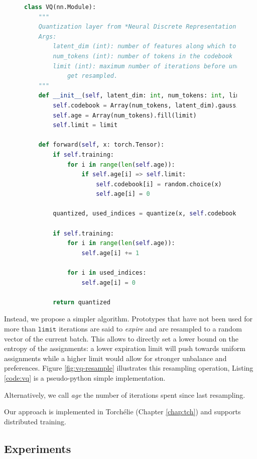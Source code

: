 \begin{figure}
\begin{lstlisting}[language=Python, caption=VQ with expiration (pseudo python),label={code:vq}]
class VQ(nn.Module):
    """
    Quantization layer from *Neural Discrete Representation Learning*
    Args:
        latent_dim (int): number of features along which to quantize
        num_tokens (int): number of tokens in the codebook
        limit (int): maximum number of iterations before unused codepoints
            get resampled.
    """
    def __init__(self, latent_dim: int, num_tokens: int, limit: int):
        self.codebook = Array(num_tokens, latent_dim).gaussian_init()
        self.age = Array(num_tokens).fill(limit)
        self.limit = limit

    def forward(self, x: torch.Tensor):
        if self.training:
            for i in range(len(self.age)):
                if self.age[i] => self.limit:
                    self.codebook[i] = random.choice(x)
                    self.age[i] = 0

        quantized, used_indices = quantize(x, self.codebook)

        if self.training:
            for i in range(len(self.age)):
                self.age[i] += 1

            for i in used_indices:
                self.age[i] = 0

        return quantized
\end{lstlisting}
\end{figure}

Instead, we propose a simpler algorithm. Prototypes that have not been used for more than $\texttt{limit}$ iterations are said to \emph{expire} and are resampled to a random vector of the current batch. This allows to directly set a lower bound on the entropy of the assignments: a lower expiration limit will push towards uniform assignments while a higher limit would allow for stronger unbalance and preferences. Figure \ref{fig:vq-resample} illustrates this resampling operation, Listing \ref{code:vq} is a pseudo-python simple implementation.

Alternatively, we call \emph{age} the number of iterations spent since last resampling.

Our approach is implemented in Torchélie (Chapter \ref{chap:tch}) and supports distributed training.

\subsection{Experiments}

